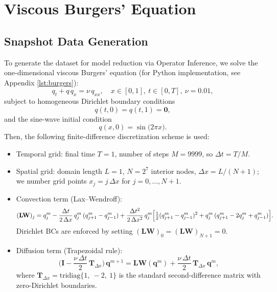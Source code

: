 \section{Viscous Burgers' Equation}
\label{sec:burgers}


\subsection*{Snapshot Data Generation}

To generate the dataset for model reduction via Operator Inference, we solve the one-dimensional viscous Burgers’ equation (for Python implementation, see Appendix \ref{lst:burgers}):\\
$$q_t + q\,q_x = \nu\,q_{xx}, \quad x\in[0,1],~t\in[0,T],~\nu=0.01,$$
subject to homogeneous Dirichlet boundary conditions\\
$$q(t,0) = q(t,1) = \bm{0},$$
and the sine-wave initial condition\\
$$q(x,0) = \sin\bigl(2\pi x\bigr).$$
Then, the following finite-difference discretization scheme is used:
\begin{itemize}
  \item Temporal grid: final time $T=1$, number of steps $M=9999$, so $\Delta t = T/M$.
  \item Spatial grid: domain length $L=1$, $N=2^7$ interior nodes, $\Delta x = L/(N+1)$; we number grid points $x_j = j\,\Delta x$ for $j=0,\ldots,N+1$.
  \item Convection term (Lax–Wendroff):\\
    $$(\mathbf{LW})_j = q_j^m
      - \frac{\Delta t}{2\,\Delta x}\,q_j^m\,(q_{j+1}^m - q_{j-1}^m)
      + \frac{\Delta t^2}{2\,\Delta x^2}\,q_j^m
        \Bigl[\tfrac12(q_{j+1}^m - q_{j-1}^m)^2
               + q_j^m\,(q_{j+1}^m - 2q_j^m + q_{j-1}^m)\Bigr].$$
    Dirichlet BCs are enforced by setting $(\mathbf{LW})_0 = (\mathbf{LW})_{N+1} = 0$.
  \item Diffusion term (Trapezoidal rule):\\
    $$\Biggl(\mathbf{I} - \dfrac{\nu\,\Delta t}{2}\,\mathbf{T}_{\Delta x}\Biggr)\,\mathbf{q}^{m+1}
      = \mathbf{LW}(\mathbf{q}^m) + \dfrac{\nu\,\Delta t}{2}\,\mathbf{T}_{\Delta x}\,\mathbf{q}^m,$$
    where $\mathbf{T}_{\Delta x}=\text{tridiag}\{1,~-2,~1\}$ is the standard second-difference matrix with zero-Dirichlet boundaries.
\end{itemize}
 
